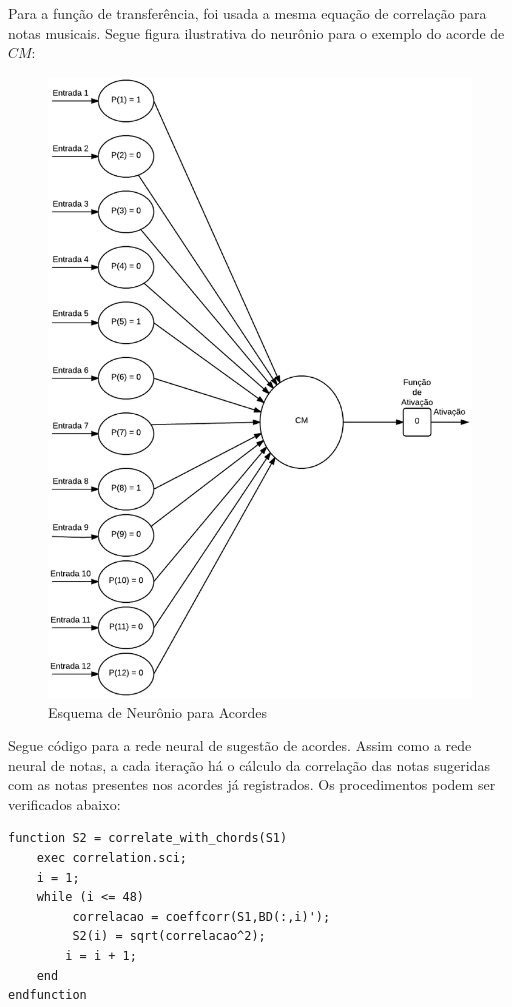Para a função de transferência, foi usada a mesma equação de correlação para notas musicais. Segue figura ilustrativa do neurônio para o exemplo do acorde de $CM$:

\begin{figure}[t]
	\centering
		\includegraphics[keepaspectratio=true,scale=0.25]{figuras/neuron_chord}
	\caption{Esquema de Neurônio para Acordes}
\end{figure}


\newpage
Segue código para a rede neural de sugestão de acordes. Assim como a rede neural de notas, a cada iteração há o cálculo da correlação das notas sugeridas com as notas presentes nos acordes já registrados. Os procedimentos podem ser verificados abaixo:

\begin{lstlisting}
function S2 = correlate_with_chords(S1)
	exec correlation.sci;
	i = 1;
	while (i <= 48)
	     correlacao = coeffcorr(S1,BD(:,i)');
	     S2(i) = sqrt(correlacao^2);
	    i = i + 1;
	end
endfunction
\end{lstlisting}


